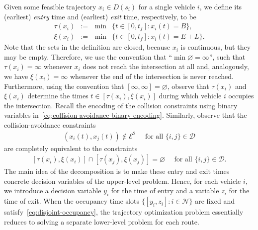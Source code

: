 \documentclass[a4paper]{report}
\theoremstyle{definition}
\theoremstyle{plain}
\begin{document}
Given some feasible trajectory $x_{i} \in D(s_{i})$ for a single vehicle $i$, we
define its (earliest) \emph{entry} time and (earliest) \emph{exit} time,
respectively, to be
%
\begin{subequations}
\begin{alignat}{2}
  \tau(x_{i}) &:=& \, \min &\{ t \in [0, t_{f}] : x_{i}(t) = B \} , \\
  \xi(x_{i}) &:=& \, \min &\{ t \in [0, t_{f}] : x_{i}(t) = E + L \} .
\end{alignat}
\end{subequations}
Note that the sets in the definition are closed, because $x_{i}$ is continuous,
but they may be empty. Therefore, we use the convention that
``$\min \varnothing = \infty$'', such that $\tau(x_{i}) = \infty$ whenever $x_{i}$
does not reach the intersection at all and, analogously, we have
$\xi(x_{i}) = \infty$ whenever the end of the intersection is never reached.
Furthermore, using the convention that $[\infty, \infty] = \varnothing$, observe
that $\tau(x_{i})$ and $\xi(x_{i})$ determine the times
$t \in [\tau(x_{i}), \xi(x_{i})]$ during which vehicle $i$ occupies the
intersection.
%
Recall the encoding of the collision constraints using binary variables
in~\eqref{eq:collision-avoidance-binary-encoding}.
%
Similarly, observe that the
collision-avoidance constraints
\begin{align}
  (x_{i}(t), x_{j}(t)) \notin \mathcal{E}^{2} \quad \text{ for all } \{i,j\} \in \mathcal{D}
\end{align}
are completely equivalent to the constraints
\begin{align}\label{eq:disjoint-occupancy}
  [\tau(x_{i}), \xi(x_{i})] \cap [\tau(x_{j}), \xi(x_{j})] = \varnothing \quad \text{ for all } \{i,j\} \in \mathcal{D} .
\end{align}
%
The main idea of the decomposition is to make these entry and exit times
concrete decision variables of the upper-level problem.
%
Hence, for each vehicle $i$, we introduce a decision variable $y_{i}$ for the
time of entry and a variable $z_{i}$ for the time of exit.
%
When the occupancy time slots $\{[y_{i}, z_{i}] : i \in \mathcal{N}\}$ are fixed
and satisfy~\eqref{eq:disjoint-occupancy}, the trajectory optimization problem
essentially reduces to solving a separate lower-level problem for each route.
\end{document}
